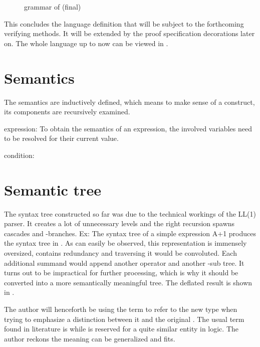 \begin{figure}
	\centering
	
	

	\caption{grammar of  (final)}
	\label{fig:grammar_core_bool_exp_final}
\end{figure}

This concludes the language definition that will be subject to the forthcoming verifying methods. It will be extended by the proof specification decorations later on. The whole language up to now can be viewed in .

\section{Semantics}

The semantics are inductively defined, which means to make sense of a construct, its components are recursively examined.

expression:
To obtain the semantics of an expression, the involved variables need to be resolved for their current value.

condition:


\section{Semantic tree}

The syntax tree constructed so far was due to the technical workings of the LL(1) parser. It creates a lot of unnecessary levels and the right recursion spawns cascades and \textepsilon{}-branches. Ex: The syntax tree of a simple expression A+1 produces the syntax tree in . As can easily be observed, this representation is immensely oversized, contains redundancy and traversing it would be convoluted. Each additional summand would append another operator and another -sub tree. It turns out to be impractical for further processing, which is why it should be converted into a more semantically meaningful tree. The deflated result is shown in .

The author will henceforth be using the term  to refer to the new type when trying to emphasize a distinction between it and the original . The usual term found in literature is  while  is reserved for a quite similar entity in logic. The author reckons the meaning can be generalized and fits.

